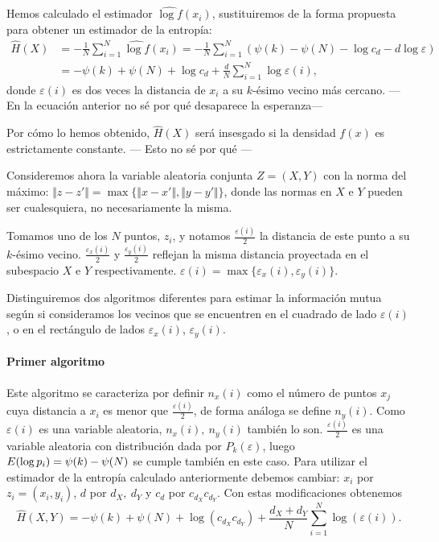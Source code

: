 \documentclass[10pt,a4paper]{article} %
\let\mathbb\relax
\theoremstyle{definition}
\begin{document}
Hemos calculado el estimador $\widehat{\log f} (x_i)$, sustituiremos de la forma propuesta para obtener un estimador de la entropía:
\begin{align}
  \widehat{H}(X) &= - \frac{1}{N} \sum_{i=1}^N\widehat{\log f} (x_i) = - \frac{1}{N} \sum_{i=1}^N\left (\psi (k) - \psi (N) - \log c_d  - d\log \varepsilon \right ) \nonumber \\
  &= - \psi (k) + \psi (N) + \log c_d + \frac{d}{N} \sum_{i=1}^N \log \varepsilon (i), \label{eq:est_ent}
\end{align}
donde $\varepsilon(i)$ es dos veces la distancia de $x_i$ a su $k$-ésimo vecino más cercano.
---En la ecuación anterior no sé por qué desaparece la esperanza---


Por cómo lo hemos obtenido, $\widehat{H}(X)$ será insesgado si la densidad $f(x)$ es estrictamente constante. --- Esto no sé por qué ---

Consideremos ahora la variable aleatoria conjunta $Z=(X,Y)$ con la norma del máximo: $\Vert z - z' \Vert = \max \{\Vert x-x' \Vert, \Vert y-y'\Vert\}$, donde las normas en $X$ e $Y$ pueden ser cualesquiera, no necesariamente la misma.

Tomamos uno de los $N$ puntos, $z_i$, y notamos $\frac{\varepsilon(i)}{2}$ la distancia de este punto a su $k$-ésimo vecino. $\frac{\varepsilon_x(i)}{2}$ y $\frac{\varepsilon_y(i)}{2}$ reflejan la misma distancia proyectada en el subespacio $X$ e $Y$ respectivamente. $\varepsilon(i) = \max \{\varepsilon_x(i), \varepsilon_y(i)\}$.

Distinguiremos dos algoritmos diferentes para estimar la información mutua según si consideramos los vecinos que se encuentren en el cuadrado de lado $\varepsilon(i)$, o en el rectángulo de lados $\varepsilon_x(i)$, $\varepsilon_y(i)$. 

\paragraph{Primer algoritmo}

Este algoritmo se caracteriza por definir $n_x(i)$ como el número de puntos $x_j$ cuya distancia a $x_i$ es menor que $\frac{\varepsilon(i)}{2}$, de forma análoga se define $n_y(i)$. Como $\varepsilon(i)$ es una variable aleatoria, $n_x(i),\ n_y(i)$ también lo son. $\frac{\varepsilon(i)}{2}$ es una variable aleatoria con distribución dada por $P_k(\varepsilon)$, luego $\mathbb{E}(\log p_i) = \psi(k) - \psi(N)$ se cumple también en este caso. Para utilizar el estimador de la entropía calculado anteriormente debemos cambiar: $x_i$ por $z_i=(x_i,y_i)$, $d$ por $d_X,\ d_Y$ y $c_d$ por $c_{d_X}c_{d_Y}$. Con estas modificaciones obtenemos\[
\widehat{H}(X,Y) = - \psi(k) + \psi(N) + \log (c_{d_X}c_{d_Y}) + \frac{d_X+d_Y}{N} \sum_{i=1}^N\log(\varepsilon(i)).
\]
\end{document}
